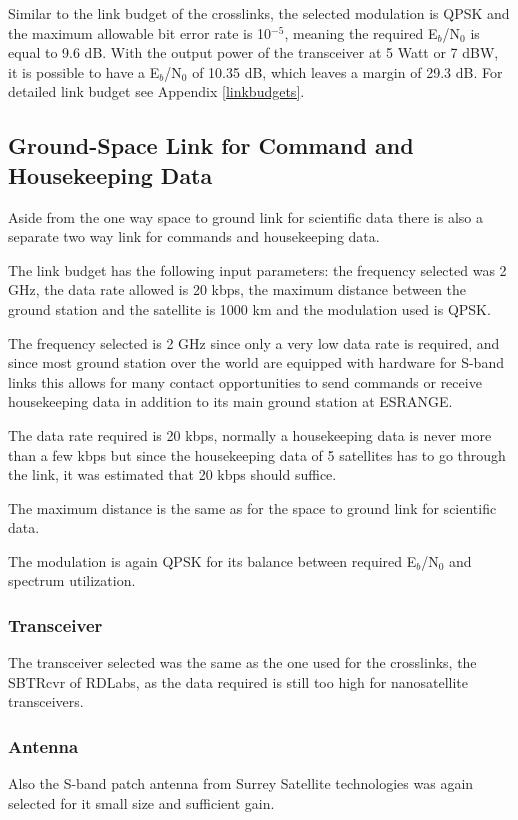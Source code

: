 Similar to the link budget of the crosslinks, the selected modulation is QPSK and the maximum allowable bit error rate is 10$^{-5}$, meaning the required E$_{b}$/N$_{0}$ is equal to 9.6 dB. With the output power of the transceiver at 5 Watt or 7 dBW, it is possible to have a E$_{b}$/N$_{0}$ of 10.35 dB, which leaves a margin of 29.3 dB. For detailed link budget see Appendix \ref{linkbudgets}.

\subsection{Ground-Space Link for Command and Housekeeping Data}
\label{emitter_GSL}
Aside from the one way space to ground link for scientific data there is also a separate two way link for commands and housekeeping data. 

The link budget has the following input parameters: the frequency selected was 2 GHz, the data rate allowed is 20 kbps, the maximum distance between the ground station and the satellite is 1000 km and the modulation used is QPSK.

The frequency selected is 2 GHz since only a very low data rate is required, and since most ground station over the world are equipped with hardware for S-band links this allows for many contact opportunities to send commands or receive housekeeping data in addition to its main ground station at ESRANGE.

The data rate required is 20 kbps, normally a housekeeping data is never more than a few kbps \cite{satcom} but since the housekeeping data of 5 satellites has to go through the link, it was estimated that 20 kbps should suffice.

The maximum distance is the same as for the space to ground link for scientific data.

The modulation is again QPSK for its balance between required E$_{b}$/N$_{0}$ and spectrum utilization.

\subsubsection{Transceiver}
The transceiver selected was the same as the one used for the crosslinks, the SBTRcvr of RDLabs, as the data required is still too high for nanosatellite transceivers.
\subsubsection{Antenna}
Also the S-band patch antenna from Surrey Satellite technologies was again selected for it small size and sufficient gain.
